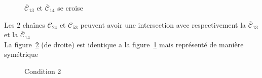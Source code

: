 \begin{figure}[!ht]\centering
	\begin{changemargin}{-3cm}{-3cm}
		\begin{center}
			
			\caption{$\overline{\mathcal{C}}_{13}$ et $\overline{\mathcal{C}}_{14}$ se croise}\label{fig:cas4_cond2_2}
		\end{center}
	\end{changemargin}
\end{figure}
\FloatBarrier
Les 2 chaînes $\mathcal{C}_{24}$ et $\mathcal{C}_{53}$ peuvent avoir une intersection avec respectivement la  $\overline{\mathcal{C}}_{13}$  et la  $\overline{\mathcal{C}}_{14}$\\
La figure~\ref{fig:cas4_cond2} (de droite) est identique a la figure~\ref{fig:cas4_cond2_2} mais représenté de manière symétrique\\

\begin{figure}[!h]\centering
	\begin{changemargin}{-3cm}{-3cm}
		\begin{center}
			
			\hspace{15pt}
			
			\hspace{15pt}
			
		\end{center}
	\end{changemargin}
	\begin{changemargin}{1.75cm}{1.75cm}
		\caption{Condition 2}\label{fig:cas4_cond2}
	\end{changemargin}
\end{figure}
\FloatBarrier


